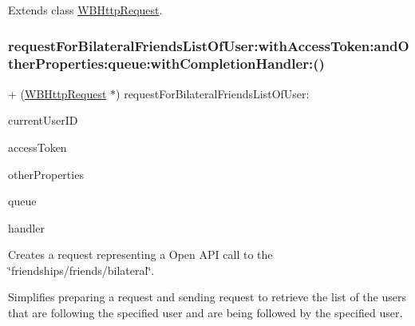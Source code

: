 Extends class \mbox{\hyperlink{interface_w_b_http_request_a8266e8e1c5230407f29ee63e05e98b38}{W\+B\+Http\+Request}}.

\mbox{\label{category_w_b_http_request_07_weibo_user_08_a8266e8e1c5230407f29ee63e05e98b38}} 
\subsubsection{\texorpdfstring{request\+For\+Bilateral\+Friends\+List\+Of\+User\+:with\+Access\+Token\+:and\+Other\+Properties\+:queue\+:with\+Completion\+Handler\+:()}{requestForBilateralFriendsListOfUser:withAccessToken:andOtherProperties:queue:withCompletionHandler:()}\hspace{0.1cm}{\footnotesize\ttfamily [2/3]}}
{\footnotesize\ttfamily + (\mbox{\hyperlink{interface_w_b_http_request}{W\+B\+Http\+Request}} $\ast$) request\+For\+Bilateral\+Friends\+List\+Of\+User\+: \begin{DoxyParamCaption}\item[{(N\+S\+String $\ast$)}]{current\+User\+ID }\item[{withAccessToken:(N\+S\+String $\ast$)}]{access\+Token }\item[{andOtherProperties:(N\+S\+Dictionary $\ast$)}]{other\+Properties }\item[{queue:(N\+S\+Operation\+Queue $\ast$)}]{queue }\item[{withCompletionHandler:(W\+B\+Request\+Handler)}]{handler }\end{DoxyParamCaption}}

Creates a request representing a Open A\+PI call to the \char`\"{}friendships/friends/bilateral\char`\"{}.

Simplifies preparing a request and sending request to retrieve the list of the users that are following the specified user and are being followed by the specified user.

